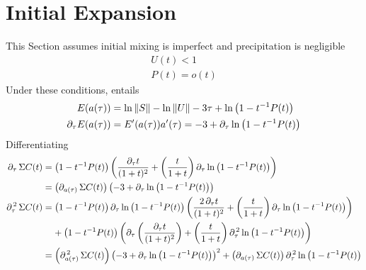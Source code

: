 \documentclass[a4paper]{base}
\begin{document}
\section{Initial Expansion}\label{sec:Exp}
    This Section assumes initial mixing is imperfect and precipitation is negligible
    \begin{equation}\label{eq:Sat:Xi}
        \begin{aligned}
            U(t) < 1 \\
            P(t) = o(t)
        \end{aligned}
    \end{equation}
    Under these conditions,  entails
    \begin{equation}\label{eq:Exp:0b}
        \begin{aligned}
            E(a(\tau)) &= \ln \left\lVert{S}\right\rVert - \ln \left\lVert{U}\right\rVert - 3\tau  + \ln \left(1-t^{-1}P(t)\right)\\
            \partial_{\tau} E(a(\tau)) &= E^{\prime}(a(\tau)) a^{\prime}(\tau) = -3 + \partial_{\tau} \ln \left(1-t^{-1}P(t)\right)
        \end{aligned}
    \end{equation}
    Differentiating 
    \begin{equation}\label{eq:Exp:0a}
        \begin{aligned}
            \partial_{\tau}\,\Sigma{C}(t) &= 
                \left(1-t^{-1}P(t)\right) \left(\frac{\partial_{\tau}t}{(1+t)^{2}} + \left(\frac{t}{1+t}\right) \partial_{\tau} \ln \left(1-t^{-1}P(t)\right) \right) \\
            &= \left(\partial_{a(\tau)}\,\Sigma{C}(t)\right) \left(-3 + \partial_{\tau} \ln \left(1-t^{-1}P(t)\right)\right) \\
            \partial_{\tau}^{\,2} \,\Sigma{C}(t) &= 
                \left(1-t^{-1}P(t)\right) \partial_{\tau} \ln \left(1-t^{-1}P(t)\right) \left(\frac{2\,\partial_{\tau}t}{(1+t)^{2}} + \left(\frac{t}{1+t}\right) \partial_{\tau} \ln \left(1-t^{-1}P(t)\right) \right) \\
                &\phantom{=\ }+ \left(1-t^{-1}P(t)\right) \left(\partial_{\tau} \left(\frac{\partial_{\tau}t}{(1+t)^{2}}\right)
                      + \left(\frac{t}{1+t}\right) \partial_{\tau}^{\,2} \ln \left(1-t^{-1}P(t)\right) \right) \\
            &= \left(\partial_{a(\tau)}^{\,2} \,\Sigma{C}(t)\right) \left(-3 + \partial_{\tau} \ln \left(1-t^{-1}P(t)\right)\right)^{2}
             + \left(\partial_{a(\tau)} \,\Sigma{C}(t)\right) \partial_{\tau}^{\,2} \ln \left(1-t^{-1}P(t)\right) \\
        \end{aligned}
    \end{equation}
\end{document}
